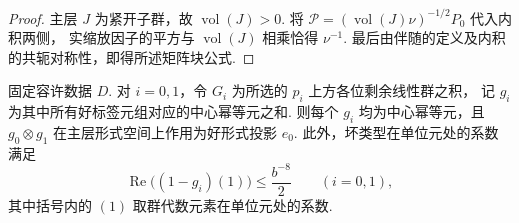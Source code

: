 \begin{proof}
主层 $J$ 为紧开子群，故 $\operatorname{vol}(J)>0$.
将 $\mathcal P=(\operatorname{vol}(J)\nu)^{-1/2}P_0$ 代入内积两侧，
实缩放因子的平方与 $\operatorname{vol}(J)$ 相乘恰得 $\nu^{-1}$.
最后由伴随的定义及内积的共轭对称性，即得所述矩阵块公式.
\end{proof}

\begin{lemma}[坏类型的比例上界]
\label{lem:b-bad-types}
\emitthmsource
固定容许数据 $D$. 对 $i=0,1$，令 $G_i$ 为所选的 $p_i$ 上方各位剩余线性群之积，
记 $g_i$ 为其中所有好标签元组对应的中心幂等元之和.
则每个 $g_i$ 均为中心幂等元，且 $g_0\otimes g_1$ 在主层形式空间上作用为好形式投影 $e_0$.
此外，坏类型在单位元处的系数满足
\[
 \operatorname{Re}\bigl((1-g_i)(1)\bigr)\le \frac{b^{-8}}2
 \qquad(i=0,1),
\]
其中括号内的 $(1)$ 取群代数元素在单位元处的系数.
\end{lemma}

